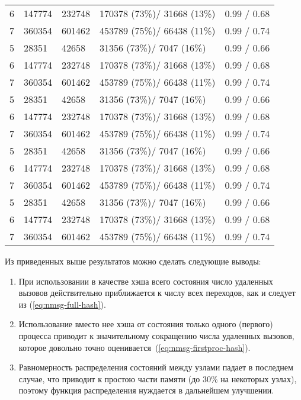 \begin{center}
\begin{longtable}{|r|l|l|l|p{}|}
    6 & 147774    & 232748   & 170378 (73\%)/ 31668 (13\%) & 0.99 / 0.68 \\ 
    7 & 360354    & 601462   & 453789 (75\%)/ 66438 (11\%) & 0.99 / 0.74 \\     
    5 & 28351     & 42658    & 31356  (73\%)/ 7047  (16\%) & 0.99 / 0.66 \\ 
    6 & 147774    & 232748   & 170378 (73\%)/ 31668 (13\%) & 0.99 / 0.68 \\ 
    7 & 360354    & 601462   & 453789 (75\%)/ 66438 (11\%) & 0.99 / 0.74 \\     
    5 & 28351     & 42658    & 31356  (73\%)/ 7047  (16\%) & 0.99 / 0.66 \\ 
    6 & 147774    & 232748   & 170378 (73\%)/ 31668 (13\%) & 0.99 / 0.68 \\ 
    7 & 360354    & 601462   & 453789 (75\%)/ 66438 (11\%) & 0.99 / 0.74 \\     
    5 & 28351     & 42658    & 31356  (73\%)/ 7047  (16\%) & 0.99 / 0.66 \\ 
    6 & 147774    & 232748   & 170378 (73\%)/ 31668 (13\%) & 0.99 / 0.68 \\ 
    7 & 360354    & 601462   & 453789 (75\%)/ 66438 (11\%) & 0.99 / 0.74 \\     
    5 & 28351     & 42658    & 31356  (73\%)/ 7047  (16\%) & 0.99 / 0.66 \\ 
    6 & 147774    & 232748   & 170378 (73\%)/ 31668 (13\%) & 0.99 / 0.68 \\ 
    7 & 360354    & 601462   & 453789 (75\%)/ 66438 (11\%) & 0.99 / 0.74 \\     
  \end{longtable}
\end{center}

Из приведенных выше результатов можно сделать следующие выводы:

\begin{enumerate}
\item При использовании в качестве  хэша всего состояния число
  удаленных вызовов действительно приближается к числу всех переходов, как и
  следует из (\ref{eq:nmsg-full-hash}).

\item Использование вместо нее хэша от состояния только одного (первого)
  процесса приводит к значительному сокращению числа удаленных
  вызовов, которое довольно точно оценивается~(\ref{eq:nmsg-firstproc-hash}).

\item Равномерность распределения состояний между узлами падает в последнем
  случае, что приводит к простою части памяти  (до 30\% на некоторых узлах),
  поэтому функция распределения нуждается в дальнейшем улучшении.
\end{enumerate}

